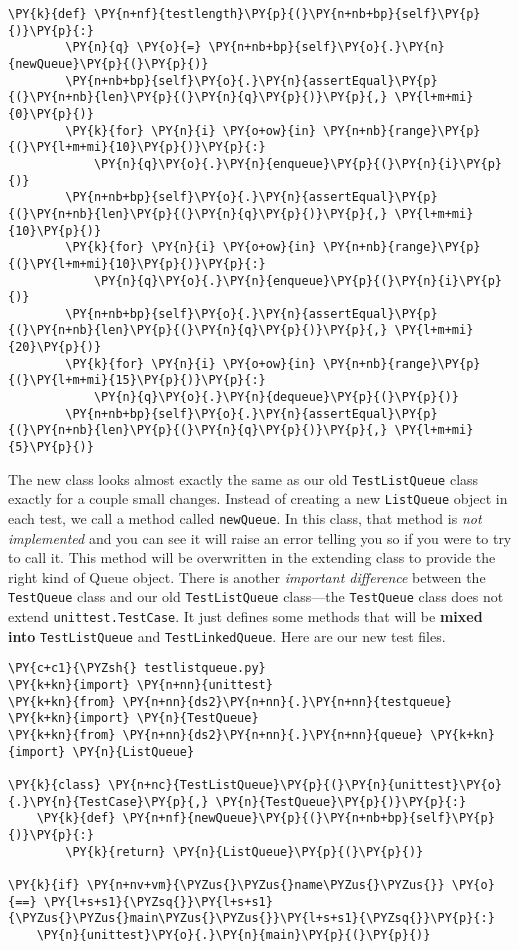 \begin{Verbatim}[commandchars=\\\{\}]
    \PY{k}{def} \PY{n+nf}{testlength}\PY{p}{(}\PY{n+nb+bp}{self}\PY{p}{)}\PY{p}{:}
        \PY{n}{q} \PY{o}{=} \PY{n+nb+bp}{self}\PY{o}{.}\PY{n}{newQueue}\PY{p}{(}\PY{p}{)}
        \PY{n+nb+bp}{self}\PY{o}{.}\PY{n}{assertEqual}\PY{p}{(}\PY{n+nb}{len}\PY{p}{(}\PY{n}{q}\PY{p}{)}\PY{p}{,} \PY{l+m+mi}{0}\PY{p}{)}
        \PY{k}{for} \PY{n}{i} \PY{o+ow}{in} \PY{n+nb}{range}\PY{p}{(}\PY{l+m+mi}{10}\PY{p}{)}\PY{p}{:}
            \PY{n}{q}\PY{o}{.}\PY{n}{enqueue}\PY{p}{(}\PY{n}{i}\PY{p}{)}
        \PY{n+nb+bp}{self}\PY{o}{.}\PY{n}{assertEqual}\PY{p}{(}\PY{n+nb}{len}\PY{p}{(}\PY{n}{q}\PY{p}{)}\PY{p}{,} \PY{l+m+mi}{10}\PY{p}{)}
        \PY{k}{for} \PY{n}{i} \PY{o+ow}{in} \PY{n+nb}{range}\PY{p}{(}\PY{l+m+mi}{10}\PY{p}{)}\PY{p}{:}
            \PY{n}{q}\PY{o}{.}\PY{n}{enqueue}\PY{p}{(}\PY{n}{i}\PY{p}{)}
        \PY{n+nb+bp}{self}\PY{o}{.}\PY{n}{assertEqual}\PY{p}{(}\PY{n+nb}{len}\PY{p}{(}\PY{n}{q}\PY{p}{)}\PY{p}{,} \PY{l+m+mi}{20}\PY{p}{)}
        \PY{k}{for} \PY{n}{i} \PY{o+ow}{in} \PY{n+nb}{range}\PY{p}{(}\PY{l+m+mi}{15}\PY{p}{)}\PY{p}{:}
            \PY{n}{q}\PY{o}{.}\PY{n}{dequeue}\PY{p}{(}\PY{p}{)}
        \PY{n+nb+bp}{self}\PY{o}{.}\PY{n}{assertEqual}\PY{p}{(}\PY{n+nb}{len}\PY{p}{(}\PY{n}{q}\PY{p}{)}\PY{p}{,} \PY{l+m+mi}{5}\PY{p}{)}
\end{Verbatim}



The new class looks almost exactly the same as our old \texttt{TestListQueue} class exactly for a couple small changes.
Instead of creating a new \texttt{ListQueue} object in each test, we call a method called \texttt{newQueue}.
In this class, that method is \emph{not implemented} and you can see it will raise an error telling you so if you were to try to call it.
This method will be overwritten in the extending class to provide the right kind of Queue object.
There is another \emph{important difference} between the \texttt{TestQueue} class and our old \texttt{TestListQueue} class---the \texttt{TestQueue} class does not extend \texttt{unittest.TestCase}.
It just defines some methods that will be \textbf{mixed into} \texttt{TestListQueue} and \texttt{TestLinkedQueue}.
Here are our new test files.

\begin{Verbatim}[commandchars=\\\{\}]
\PY{c+c1}{\PYZsh{} testlistqueue.py}
\PY{k+kn}{import} \PY{n+nn}{unittest}
\PY{k+kn}{from} \PY{n+nn}{ds2}\PY{n+nn}{.}\PY{n+nn}{testqueue} \PY{k+kn}{import} \PY{n}{TestQueue}
\PY{k+kn}{from} \PY{n+nn}{ds2}\PY{n+nn}{.}\PY{n+nn}{queue} \PY{k+kn}{import} \PY{n}{ListQueue}

\PY{k}{class} \PY{n+nc}{TestListQueue}\PY{p}{(}\PY{n}{unittest}\PY{o}{.}\PY{n}{TestCase}\PY{p}{,} \PY{n}{TestQueue}\PY{p}{)}\PY{p}{:}
    \PY{k}{def} \PY{n+nf}{newQueue}\PY{p}{(}\PY{n+nb+bp}{self}\PY{p}{)}\PY{p}{:}
        \PY{k}{return} \PY{n}{ListQueue}\PY{p}{(}\PY{p}{)}

\PY{k}{if} \PY{n+nv+vm}{\PYZus{}\PYZus{}name\PYZus{}\PYZus{}} \PY{o}{==} \PY{l+s+s1}{\PYZsq{}}\PY{l+s+s1}{\PYZus{}\PYZus{}main\PYZus{}\PYZus{}}\PY{l+s+s1}{\PYZsq{}}\PY{p}{:}
    \PY{n}{unittest}\PY{o}{.}\PY{n}{main}\PY{p}{(}\PY{p}{)}
\end{Verbatim}


